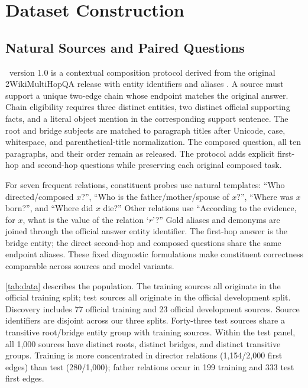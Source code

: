 \section{Dataset Construction}
\label{app:data}

\subsection{Natural Sources and Paired Questions}

\dataset\ version 1.0 is a contextual composition protocol derived from the original 2WikiMultiHopQA release with entity identifiers and aliases \citep{ho2020constructing}. A source must support a unique two-edge chain whose endpoint matches the original answer. Chain eligibility requires three distinct entities, two distinct official supporting facts, and a literal object mention in the corresponding support sentence. The root and bridge subjects are matched to paragraph titles after Unicode, case, whitespace, and parenthetical-title normalization. The composed question, all ten paragraphs, and their order remain as released. The protocol adds explicit first-hop and second-hop questions while preserving each original composed task.

For seven frequent relations, constituent probes use natural templates: ``Who directed/composed $x$?'', ``Who is the father/mother/spouse of $x$?'', ``Where was $x$ born?'', and ``Where did $x$ die?'' Other relations use ``According to the evidence, for $x$, what is the value of the relation `$r$'?'' Gold aliases and demonyms are joined through the official answer entity identifier. The first-hop answer is the bridge entity; the direct second-hop and composed questions share the same endpoint aliases. These fixed diagnostic formulations make constituent correctness comparable across sources and model variants.

\cref{tab:data} describes the population. The training sources all originate in the official training split; test sources all originate in the official development split. Discovery includes 77 official training and 23 official development sources. Source identifiers are disjoint across our three splits. Forty-three test sources share a transitive root/bridge entity group with training sources. Within the test panel, all 1,000 sources have distinct roots, distinct bridges, and distinct transitive groups. Training is more concentrated in director relations (1,154/2,000 first edges) than test (280/1,000); father relations occur in 199 training and 333 test first edges.

